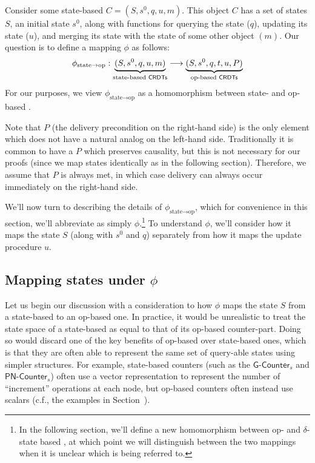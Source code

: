 Consider some state-based \CRDT $C = (S, s^0, q, u, m)$. This object $C$ has a
set of states $S$, an initial state $s^0$, along with functions for querying the
state ($q$), updating its state ($u$), and merging its state with the state of
some other object $(m)$. Our question is to define a mapping $\phi$ as
follows:
\[
  \phi_{\text{state} \to \text{op}} :
    \underbrace{(S, s^0, q, u, m)}_{\text{state-based \textsf{CRDTs}}} \longrightarrow
    \underbrace{(S, s^0, q, t, u, P)}_{\text{op-based \textsf{CRDTs}}}
\]
For our purposes, we view $\phi_{\text{state} \to \text{op}}$ as a homomorphism
between state- and op-based \CRDTs.

Note that $P$ (the delivery precondition on the right-hand side) is the only
element which does not have a natural analog on the left-hand side.
Traditionally it is common to have a $P$ which preserves causality, but this is
not necessary for our proofs (since we map states identically as in the
following section). Therefore, we assume that $P$ is always met, in which case
delivery can always occur immediately on the right-hand side.

We'll now turn to describing the details of $\phi_{\text{state} \to \text{op}}$,
which for convenience in this section, we'll abbreviate as simply
$\phi$.\footnote{In the following section, we'll define a new homomorphism
between op- and $\delta$-state based \CRDTs, at which point we will
distinguish between the two mappings when it is unclear which is being referred
to.} To understand $\phi$, we'll consider how it maps the state $S$ (along with
$s^0$ and $q$) separately from how it maps the update procedure $u$.

\subsection{Mapping states under $\phi$}

Let us begin our discussion with a consideration to how $\phi$ maps the state
$S$ from a state-based \CRDT to an op-based one. In practice, it would be
unrealistic to treat the state space of a state-based \CRDT as equal to that of
its op-based counter-part. Doing so would discard one of the key benefits of
op-based \CRDTs over state-based ones, which is that they are often able to
represent the same set of query-able states using simpler structures. For
example, state-based counters (such as the $\textsf{G-Counter}_s$ and
$\textsf{PN-Counter}_s$) often use a vector representation to represent the
number of ``increment'' operations at each node, but op-based counters often
instead use scalars (c.f., the examples in
Section~\label{sec:example-gcounter}).

